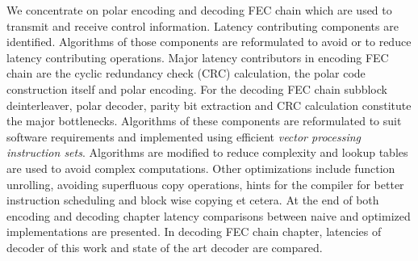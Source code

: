 We concentrate on polar encoding and decoding FEC chain which are used to transmit and receive control information. Latency contributing components are identified. Algorithms of those components are reformulated to avoid or to reduce latency contributing operations. Major latency contributors in encoding FEC chain are the cyclic redundancy check (CRC) calculation, the polar code construction itself and polar encoding. For the decoding FEC chain subblock deinterleaver, polar decoder, parity bit extraction and CRC calculation constitute the major bottlenecks. Algorithms of these components are reformulated to suit software requirements and implemented using efficient \emph{vector processing instruction sets}. Algorithms are modified to reduce complexity and lookup tables are used to avoid complex computations. Other optimizations include function unrolling, avoiding superfluous copy operations, hints for the compiler for better instruction scheduling and block wise copying et cetera. At the end of both encoding and decoding chapter latency comparisons between naive and optimized implementations are presented. In decoding FEC chain chapter, latencies of decoder of this work and state of the art decoder are compared.